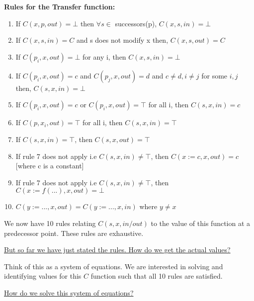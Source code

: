 \vspace{0.3cm}

\textbf{Rules for the Transfer function:}

\begin{enumerate}
    \item If $C(x, p, out) = \bot$ then $\forall s \in$ successors(p), $C(x, s, in) = \bot$
    \item If $C(x, s, in) = C$ and s does not modify x then, $C(x, s, out) = C$
    \item If $C(p_i, x, out) = \bot$ for any i, then $C(x, s, in) = \bot$
    \item If $C(p_i, x, out) = c$ and $C(p_j, x, out) = d$ and $c \neq d, i \neq j$ for some $i, j$ then, $C(s,x,in) = \bot$
    \item If $C(p_i, x, out) = c$ or $C(p_i, x, out) = \top$ for all i, then $C(s, x, in) = c$
    \item If $C(p, x_i, out) = \top$ for all i, then $C(s, x, in) = \top$
    \item If $C(s, x, in) = \top$, then $C(s, x, out) = \top$
    \item If rule 7 does not apply i.e $C(s,x,in) \neq \top$, then $C(x := c, x, out) = c$ [where c is a constant]
    \item If rule 7 does not apply i.e $C(s,x,in) \neq \top$, then $C(x := f(...), x, out) = \bot$
    \item $C(y := ..., x, out) = C(y:=..., x, in)$ where $y \neq x$
\end{enumerate}

We now have 10 rules relating $C(s, x, in/out)$ to the value of this function at a predecessor point. These rules are exhaustive.

\vspace{0.3cm}

\underline{But so far we have just stated the rules. How do we get the actual values?}

\vspace{0.3cm}

Think of this as a system of equations. We are interested in solving and identifying values for this $C$ function such that all 10 rules are satisfied.

\vspace{0.3cm}

\underline{How do we solve this system of equations?}

\vspace{0.3cm}

